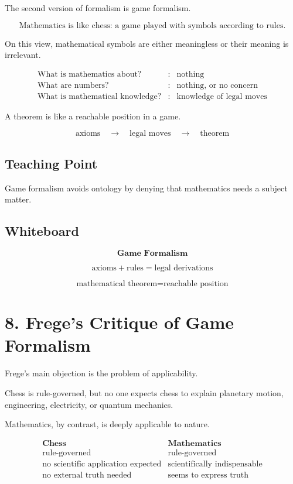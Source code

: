 \documentclass[11pt]{article}
\begin{document}
The second version of formalism is game formalism.

\[
\boxed{
\text{Mathematics is like chess: a game played with symbols according to rules.}
}
\]

On this view, mathematical symbols are either meaningless or their meaning is irrelevant.

\[
\begin{array}{rcl}
\text{What is mathematics about?} &:& \text{nothing} \\
\text{What are numbers?} &:& \text{nothing, or no concern} \\
\text{What is mathematical knowledge?} &:& \text{knowledge of legal moves}
\end{array}
\]

A theorem is like a reachable position in a game.

\[
\text{axioms}
\quad \longrightarrow \quad
\text{legal moves}
\quad \longrightarrow \quad
\text{theorem}
\]

\subsection*{Teaching Point}

Game formalism avoids ontology by denying that mathematics needs a subject matter.

\subsection*{Whiteboard}

\[
\textbf{Game Formalism}
\]

\[
\text{axioms} + \text{rules} = \text{legal derivations}
\]

\[
\text{mathematical theorem} = \text{reachable position}
\]

\section*{8. Frege's Critique of Game Formalism}

Frege's main objection is the problem of applicability.

Chess is rule-governed, but no one expects chess to explain planetary motion, engineering,
electricity, or quantum mechanics.

Mathematics, by contrast, is deeply applicable to nature.

\[
\begin{array}{c|c}
\textbf{Chess} & \textbf{Mathematics} \\
\hline
\text{rule-governed} & \text{rule-governed} \\
\text{no scientific application expected} & \text{scientifically indispensable} \\
\text{no external truth needed} & \text{seems to express truth}
\end{array}
\]
\end{document}
